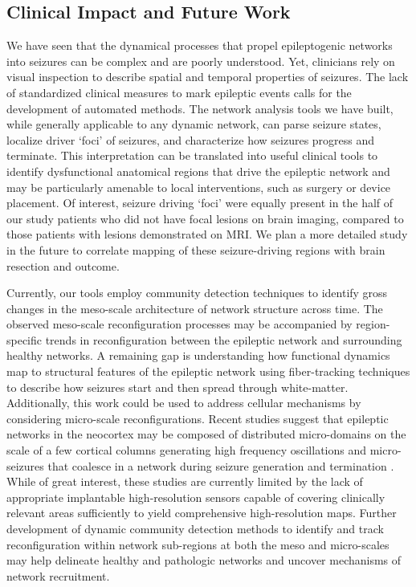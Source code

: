 \subsection{Clinical Impact and Future Work}
We have seen that the dynamical processes that propel epileptogenic networks into seizures can be complex and are poorly understood. Yet, clinicians rely on visual inspection to describe spatial and temporal properties of seizures. The lack of standardized clinical measures to mark epileptic events calls for the development of automated methods. The network analysis tools we have built, while generally applicable to any dynamic network, can parse seizure states, localize driver `foci' of seizures, and characterize how seizures progress and terminate. This interpretation can be translated into useful clinical tools to identify dysfunctional anatomical regions that drive the epileptic network and may be particularly amenable to local interventions, such as surgery or device placement. Of interest, seizure driving `foci' were equally present in the half of our study patients who did not have focal lesions on brain imaging, compared to those patients with lesions demonstrated on MRI. We plan a more detailed study in the future to correlate mapping of these seizure-driving regions with brain resection and outcome. 

Currently, our tools employ community detection techniques to identify gross changes in the meso-scale architecture of network structure across time. The observed meso-scale reconfiguration processes may be accompanied by region-specific trends in reconfiguration between the epileptic network and surrounding healthy networks. A remaining gap is understanding how functional dynamics map to structural features of the epileptic network using fiber-tracking techniques to describe how seizures start and then spread through white-matter. Additionally, this work could be used to address cellular mechanisms by considering micro-scale reconfigurations. Recent studies suggest that epileptic networks in the neocortex may be composed of distributed micro-domains on the scale of a few cortical columns generating high frequency oscillations and micro-seizures that coalesce in a network during seizure generation and termination \cite{stead2010microseizures}. While of great interest, these studies are currently limited by the lack of appropriate implantable high-resolution sensors capable of covering clinically relevant areas sufficiently to yield comprehensive high-resolution maps. Further development of dynamic community detection methods to identify and track reconfiguration within network sub-regions at both the meso and micro-scales may help delineate healthy and pathologic networks and uncover mechanisms of network recruitment.

